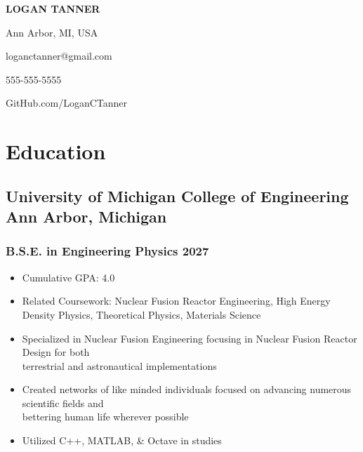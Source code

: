 \documentclass[10pt]{article} %
\begin{document}
\begin{center}
    \begin{minipage}{0.5\textwidth}
        {\huge\bfseries
            LOGAN TANNER 
        } \\ \medskip
    \end{minipage} \hfill
    \begin{minipage}{0.4\textwidth}
        \raggedleft
        \begin{description}[style=multiline, leftmargin=2cm]
            \item[Residence] Ann Arbor, MI, USA
            \item[Email] loganctanner@gmail.com
            \item[Mobile] 555-555-5555
            \item[GitHub] GitHub.com/LoganCTanner
        \end{description}
    \end{minipage}
\end{center}

\section{Education}
\subsection{University of Michigan College of Engineering \hfill Ann Arbor, Michigan}
\subsubsection{B.S.E. in Engineering Physics \hfill 2027}
\begin{itemize}
    \item {Cumulative GPA: 4.0}
    \item {Related Coursework: Nuclear Fusion Reactor Engineering, 
        High Energy Density Physics, Theoretical Physics, Materials Science} 
    \item {Specialized in Nuclear Fusion Engineering focusing in Nuclear 
        Fusion Reactor Design for both  \\ terrestrial and astronautical implementations}
    \item {Created networks of like minded individuals focused on advancing
        numerous scientific fields and \\ bettering human life wherever possible}
    \item {Utilized C++, MATLAB, \& Octave in studies}    
\end{itemize}
\end{document}
